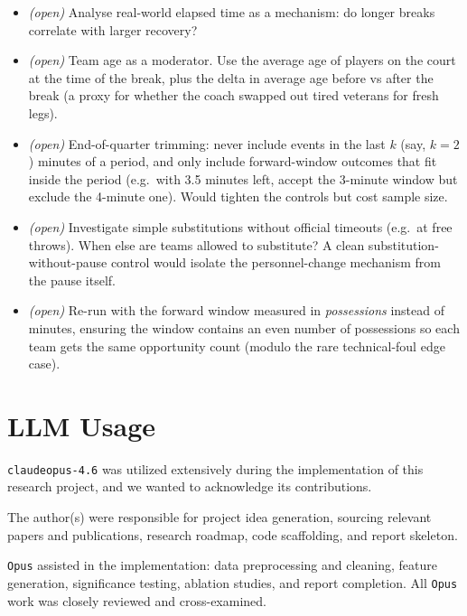 \documentclass[twoside,11pt]{article}
\begin{document}
\begin{itemize}
		\item \emph{(open)} Analyse real-world elapsed time as a mechanism: do longer breaks correlate
				with larger recovery?
		\item \emph{(open)} Team age as a moderator. Use the average age of players on the court at the
				time of the break, plus the delta in average age before vs after the break (a proxy for
				whether the coach swapped out tired veterans for fresh legs).
		\item \emph{(open)} End-of-quarter trimming: never include events in the last $k$ (say, $k = 2$)
				minutes of a period, and only include forward-window outcomes that fit inside the period
				(e.g.\ with 3.5 minutes left, accept the 3-minute window but exclude the 4-minute one).
				Would tighten the controls but cost sample size.
		\item \emph{(open)} Investigate simple substitutions without official timeouts (e.g.\ at free
				throws). When else are teams allowed to substitute? A clean substitution-without-pause
				control would isolate the personnel-change mechanism from the pause itself.
		\item \emph{(open)} Re-run with the forward window measured in \emph{possessions} instead of
				minutes, ensuring the window contains an even number of possessions so each team gets the
				same opportunity count (modulo the rare technical-foul edge case).
\end{itemize}


\section*{LLM Usage}

\texttt{claude\/opus-4.6} was utilized extensively during the implementation of this research project, and we
wanted to acknowledge its contributions.

The author(s) were responsible for project idea generation, sourcing relevant papers and publications,
research roadmap, code scaffolding, and report skeleton.

\texttt{Opus} assisted in the implementation: data preprocessing and cleaning, feature generation,
significance testing, ablation studies, and report completion. All \texttt{Opus} work was closely reviewed
and cross-examined.

\end{document}
